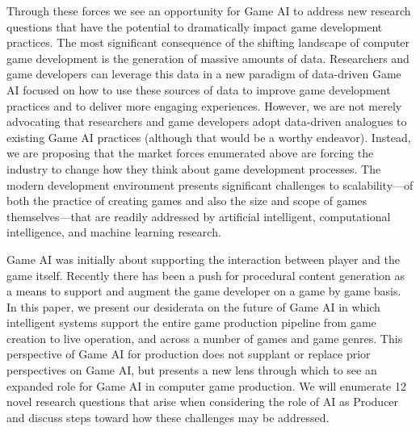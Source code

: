 \documentclass[conference]{IEEEtran}
\begin{document}
Through these forces we see an opportunity for Game AI to address new research questions that have the potential to dramatically impact game development practices.
%
The most significant consequence of the shifting landscape of computer game development is the generation of massive amounts of data. 
Researchers and game developers can leverage this data in a new paradigm of data-driven Game AI focused on how to use these sources of data to 
improve game development practices and to deliver more engaging experiences.
However, we are not merely advocating that researchers and game developers adopt data-driven analogues to existing Game AI practices (although that would be a worthy endeavor).
Instead, we are proposing that the market forces enumerated above are forcing the industry to change how they think about game development processes.
The modern development environment presents significant challenges to scalability---of both the practice of creating games and also the size and scope of games themselves---that are readily addressed by artificial intelligent, computational intelligence, and machine learning research.

Game AI was initially about supporting the interaction between player and the game itself.
Recently there has been a push for procedural content generation as a means to support and augment the game developer on a game by game basis.
%
In this paper, we present our desiderata on the future of Game AI
in which intelligent systems support the entire game production pipeline from game creation to live operation, and across a number of games and game genres.
This perspective of Game AI 
for production
does not supplant or replace prior perspectives on Game AI, but presents a new lens through which to see an expanded role for Game AI in computer game production. 
We will enumerate 12 novel research questions that arise when considering the role of AI as Producer and discuss steps toward how these challenges may be addressed. 
\end{document}
